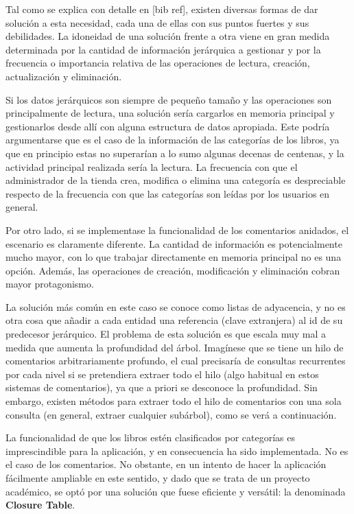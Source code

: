 \documentclass[a4paper]{article}
\begin{document}
    Tal como se explica con detalle en [bib ref], existen diversas formas de dar solución a esta necesidad, cada una de ellas con sus puntos fuertes y sus debilidades. La idoneidad de una solución frente a otra viene en gran medida determinada por la cantidad de información jerárquica a gestionar y por la frecuencia o importancia relativa de las operaciones de lectura, creación, actualización y eliminación.
    
    Si los datos jerárquicos son siempre de pequeño tamaño y las operaciones son principalmente de lectura, una solución sería cargarlos en memoria principal y gestionarlos desde allí con alguna estructura de datos apropiada. Este podría argumentarse que es el caso de la información de las categorías de los libros, ya que en principio estas no superarían a lo sumo algunas decenas de centenas, y la actividad principal realizada sería la lectura. La frecuencia con que el administrador de la tienda crea, modifica o elimina una categoría es despreciable respecto de la frecuencia con que las categorías son leídas por los usuarios en general.
    
    Por otro lado, si se implementase la funcionalidad de los comentarios anidados, el escenario es claramente diferente. La cantidad de información es potencialmente mucho mayor, con lo que trabajar directamente en memoria principal no es una opción. Además, las operaciones de creación, modificación y eliminación cobran mayor protagonismo.
    
    La solución más común en este caso se conoce como listas de adyacencia, y no es otra cosa que añadir a cada entidad una referencia (clave extranjera) al id de su predecesor jerárquico. El problema de esta solución es que escala muy mal a medida que aumenta la profundidad del árbol. Imagínese que se tiene un hilo de comentarios arbitrariamente profundo, el cual precisaría de consultas recurrentes por cada nivel si se pretendiera extraer todo el hilo (algo habitual en estos sistemas de comentarios), ya que a priori se desconoce la profundidad. Sin embargo, existen métodos para extraer todo el hilo de comentarios con una sola consulta (en general, extraer cualquier subárbol), como se verá a continuación.
    
    La funcionalidad de que los libros estén clasificados por categorías es imprescindible para la aplicación, y en consecuencia ha sido implementada. No es el caso de los comentarios. No obstante, en un intento de hacer la aplicación fácilmente ampliable en este sentido, y dado que se trata de un proyecto académico, se optó por una solución que fuese eficiente y versátil: la denominada \textbf{Closure Table}.
    
\end{document}

